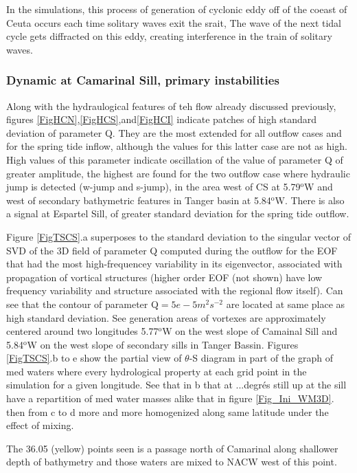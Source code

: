 In the simulations, this process of generation of cyclonic eddy off of the coeast of Ceuta occurs each time solitary waves exit the srait,  The wave of the next tidal cycle gets diffracted on this eddy, creating interference in the train of solitary waves.



\subsubsection{Dynamic at Camarinal Sill, primary instabilities}


Along with the hydraulogical features of teh flow already discussed previously, figures \ref{FigHCN},\ref{FigHCS},and\ref{FigHCI}  indicate patches of high standard deviation of parameter Q. They are the most extended for all outflow cases and for the spring tide inflow, although the values for this latter case are not as high. High values of this parameter indicate oscillation of the value of parameter Q of greater amplitude, the highest are found for the two outflow case where hydraulic jump is detected (w-jump and s-jump), in the area west of CS at 5.79$^\text{o}$W and west of secondary bathymetric features in Tanger basin at 5.84$^\text{o}$W. There is also a signal at Espartel Sill, of greater standard deviation for the spring tide outflow.

Figure \ref{FigTSCS}.a superposes to the standard deviation to the singular vector of SVD of the 3D field of parameter Q computed during the outflow for the EOF that had the most high-frequencey variability in its eigenvector, associated with propagation of vortical structures (higher order EOF (not shown) have low frequency variability and structure associated with the regional flow itself). Can see that the contour of parameter Q$=5e-5m^2s^{-2}$ are located at same place as high standard deviation. See generation areas of vortexes are approximately centered around two longitudes 5.77$^\text{o}$W on the west slope of Camainal Sill and  5.84$^\text{o}$W on the west slope of secondary sills in Tanger Bassin. Figures \ref{FigTSCS}.b to e show the partial view of $\theta$-S diagram in part of the graph of med waters where every hydrological property at each grid point in the simulation for a given longitude. See that in b that at ...degrés still up at the sill have a repartition of med water masses alike that in figure \ref{Fig_Ini_WM3D}. then from c to d more and more homogenized along same latitude under the effect of mixing.

The 36.05 (yellow) points seen is a passage north of Camarinal along shallower depth of bathymetry and those waters are mixed to NACW west of this point.

